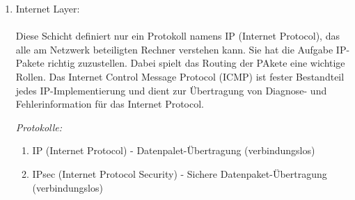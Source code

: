 \documentclass[11pt]{article}
\begin{document}
\begin{enumerate}
\begin{addmargin}[1em]{1em}
\begin{enumerate}
                \item UDP (User Datagram Protocol) - Übertragung von Datenpaketen
                (verbindungslos, unzuverlässig, geringer Overhead).\\

                \item SCTP (Stream Control Transmission Protocol) - Transportprotokoll.\\

                \item TLS (Transport Layer Security) - Erweiterung von TCP um Verschlüsselung.\\

                \item DTLS (Datagram Transport Layer Security) - Auf TLS basierendes
                Verschlüsselungsprotokoll, das auch über zustandslose Protokolle wie UDP
                übertragen werden kann.\\

            \end{enumerate}

        \end{addmargin}

        \item Internet Layer:\\\\
        Diese Schicht definiert nur ein Protokoll namens IP (Internet Protocol), das alle am Netzwerk
        beteiligten Rechner verstehen kann. Sie hat die Aufgabe IP-Pakete richtig zuzustellen. Dabei
        spielt das Routing der PAkete eine wichtige Rollen. Das Internet Control Message Protocol (ICMP)
        ist fester Bestandteil jedes IP-Implementierung und dient zur Übertragung von Diagnose- und
        Fehlerinformation für das Internet Protocol.\\

        \begin{addmargin}[1em]{1em}
            \emph{Protokolle:}\\

            \begin{enumerate}

                \item IP (Internet Protocol) - Datenpalet-Übertragung (verbindungslos)\\

                \item IPsec (Internet Protocol Security) - Sichere Datenpaket-Übertragung (verbindungslos)\\


\end{enumerate}
\end{addmargin}
\end{enumerate}
\end{document}
